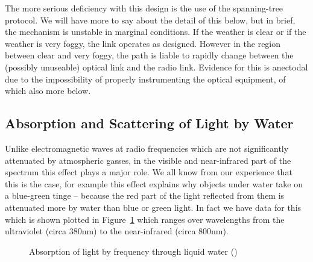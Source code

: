 The more serious deficiency with this design is the use of the
spanning-tree protocol. We will have more to say about the detail of
this below, but in brief, the mechanism is unstable in marginal
conditions. If the weather is clear or if the weather is very foggy,
the link operates as designed. However in the region between clear and
very foggy, the path is liable to rapidly change between the (possibly
unuseable) optical link and the radio link. Evidence for this is
anectodal due to the impossibility of properly instrumenting the
optical equipment, of which also more below.
\clearpage

\subsection{Absorption and Scattering of Light by Water}
\label{sec:attenuation}

Unlike electromagnetic waves at radio frequencies which are not
significantly attenuated by atmospheric gasses, in the visible and
near-infrared part of the spectrum this effect plays a major role. We
all know from our experience that this is the case, for example this
effect explains why objects under water take on a blue-green tinge --
because the red part of the light reflected from them is attenuated
more by water than blue or green light. In fact we have data for this
which is shown plotted in Figure~\ref{fig:absorption-liquid} which
ranges over wavelengths from the ultraviolet (circa 380nm) to the
near-infrared (circa 800nm).
\begin{figure}[h]
  \centering
  \caption{Absorption of light by frequency through liquid water
    (\cite{jonasz_absorption_2007})}
  \label{fig:absorption-liquid}
\end{figure}

